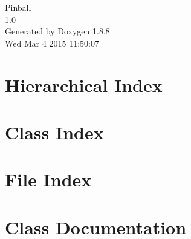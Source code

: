 \documentclass[twoside]{book}
\newcommand{\+}{\discretionary{\mbox{\scriptsize$\hookleftarrow$}}{}{}}
\newcommand{\clearemptydoublepage}{%
  \newpage{\pagestyle{empty}\cleardoublepage}%
}
\begin{document}
\hypersetup{pageanchor=false,
             bookmarks=true,
             bookmarksnumbered=true,
             pdfencoding=unicode
            }
\begin{titlepage}
\vspace*{7cm}
\begin{center}%
{\Large Pinball \\[1ex]\large 1.\+0 }\\
\vspace*{1cm}
{\large Generated by Doxygen 1.8.8}\\
\vspace*{0.5cm}
{\small Wed Mar 4 2015 11:50:07}\\
\end{center}
\end{titlepage}
\clearemptydoublepage
\tableofcontents
\clearemptydoublepage
{}
\hypersetup{pageanchor=true}

\chapter{Hierarchical Index}

\chapter{Class Index}

\chapter{File Index}

\chapter{Class Documentation}


































\end{document}
